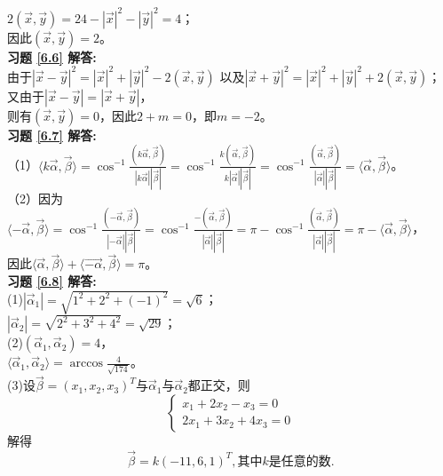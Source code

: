 \documentclass[a4paper]{book}
\begin{document}
$2(\vec{x},\vec{y})=24-|\vec{x}|^2-|\vec{y}|^2=4$；\\
因此$(\vec{x},\vec{y})=2$。\\
\textbf{习题 \ref{6.6} 解答:}\\
由于$|\vec{x}-\vec{y}|^2=|\vec{x}|^2+|\vec{y}|^2-2(\vec{x},\vec{y})$ 以及$|\vec{x}+\vec{y}|^2=|\vec{x}|^2+|\vec{y}|^2+2(\vec{x},\vec{y})$；\\
又由于$|\vec{x}-\vec{y}|=|\vec{x}+\vec{y}|$，\\
则有$(\vec{x},\vec{y})=0$，因此$2+m=0$，即$m=-2$。\\
\textbf{习题 \ref{6.7} 解答:}\\
（1）$\langle k\vec{\alpha},\vec{\beta}\rangle=\cos^{-1}\frac{(k\vec{\alpha},\vec{\beta})}{|k\vec{\alpha}||\vec{\beta}|}
   =\cos^{-1}\frac{k(\vec{\alpha},\vec{\beta})}{k|\vec{\alpha}||\vec{\beta}|}
   =\cos^{-1}\frac{(\vec{\alpha},\vec{\beta})}{|\vec{\alpha}||\vec{\beta}|}
   =\langle\vec{\alpha},\vec{\beta}\rangle$。\\
（2）因为$\langle -\vec{\alpha},\vec{\beta}\rangle=\cos^{-1}\frac{(-\vec{\alpha},\vec{\beta})}{|-\vec{\alpha}||\vec{\beta}|}
   =\cos^{-1}\frac{-(\vec{\alpha},\vec{\beta})}{|\vec{\alpha}||\vec{\beta}|}
   =\pi-\cos^{-1}\frac{(\vec{\alpha},\vec{\beta})}{|\vec{\alpha}||\vec{\beta}|}
   =\pi-\langle\vec{\alpha},\vec{\beta}\rangle$，\\
   因此$\langle\vec{\alpha},\vec{\beta}\rangle+\langle\vec{-\alpha},\vec{\beta}\rangle=\pi$。\\
\textbf{习题 \ref{6.8} 解答:}\\
(1)$|\vec{\alpha}_1|=\sqrt{1^2+2^2+(-1)^2}=\sqrt{6}$；\\
$|\vec{\alpha}_2|=\sqrt{2^2+3^2+4^2}=\sqrt{29}$；\\
(2)$(\vec{\alpha}_1,\vec{\alpha}_2)=4$，\\
$\langle\vec{\alpha}_1,\vec{\alpha}_2\rangle=\arccos\frac{4}{\sqrt{174}}$。\\
(3)设$\vec{\beta}=(x_1,x_2,x_3)^T$与$\vec{\alpha}_1$与$\vec{\alpha}_2$都正交，则
\begin{equation*}
  \begin{cases}
  x_1+2x_2-x_3=0\\
  2x_1+3x_2+4x_3=0
  \end{cases}
\end{equation*}
解得
\begin{equation*}
\vec{\beta}=k(-11,6,1)^T,\text{其中}k\text{是任意的数}.
\end{equation*}\\
\end{document}
